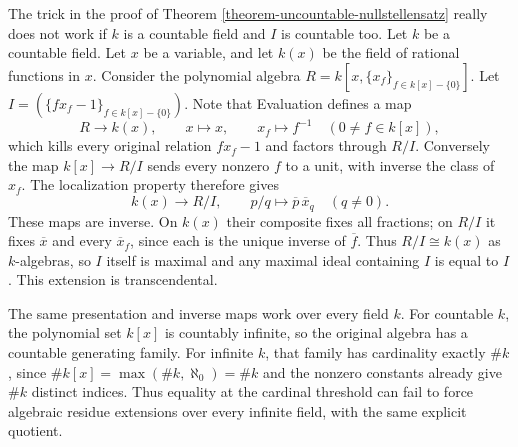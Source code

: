\begin{example}
\label{example-countable-trick-does-not-work}
The trick in the proof of
Theorem \ref{theorem-uncountable-nullstellensatz}
really does not work if $k$ is a countable field and $I$ is countable too.
Let $k$ be a countable field. Let $x$ be a variable,
and let $k(x)$ be the field of rational functions in $x$.
Consider the polynomial algebra $R = k[x, \{x_f\}_{f \in k[x]-\{0\}}]$.
Let $I = (\{fx_f - 1\}_{f\in k[x] - \{0\}})$. Note that
Evaluation defines a map
$$
R\longrightarrow k(x),\qquad x\longmapsto x,\qquad
x_f\longmapsto f^{-1}\quad(0\ne f\in k[x]),
$$
which kills every original relation $fx_f-1$ and factors through
$R/I$. Conversely the map $k[x]\to R/I$ sends every nonzero
$f$ to a unit, with inverse the class of $x_f$. The localization
property therefore gives
$$
k(x)\longrightarrow R/I,\qquad p/q\longmapsto
\overline p\,\overline{x}_q\quad(q\ne0).
$$
These maps are inverse. On $k(x)$ their composite fixes all fractions;
on $R/I$ it fixes $\overline x$ and every $\overline{x}_f$, since
each is the unique inverse of $\overline f$. Thus $R/I\cong k(x)$
as $k$-algebras, so $I$ itself is maximal and any maximal ideal
containing $I$ is equal to $I$. This extension is transcendental.

The same presentation and inverse maps work over every field $k$.
For countable $k$, the polynomial set $k[x]$ is countably infinite,
so the original algebra has a countable generating family.
For infinite $k$, that family has cardinality exactly $\#k$, since
$\#k[x]=\max(\#k,\aleph_0)=\#k$ and the nonzero constants already
give $\#k$ distinct indices. Thus equality at the cardinal threshold
can fail to force algebraic residue extensions over every infinite
field, with the same explicit quotient.
\end{example}